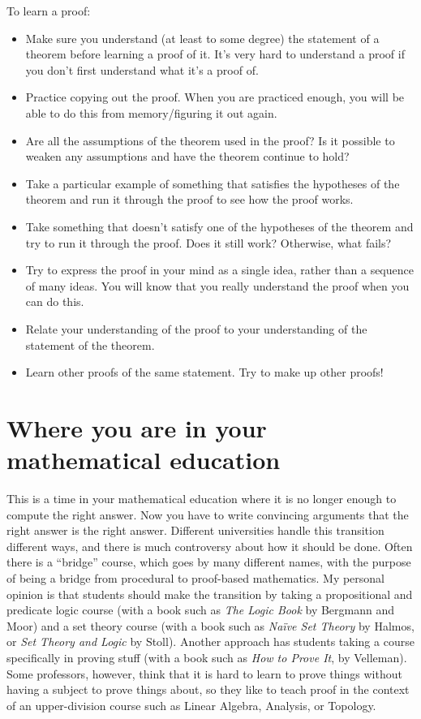 \documentclass[12pt]{article}
\begin{document}
To learn a proof:
\begin{itemize}
  \item Make sure you understand (at least to some degree) the
    statement of a theorem before learning a proof of it.  It's very
    hard to understand a proof if you don't first understand what it's
    a proof of. 
  \item Practice copying out the proof.  When you are practiced
    enough, you will be able to do this from memory/figuring it out
    again. 
  \item Are all the assumptions of the theorem used in the proof?  Is
    it possible to weaken any assumptions and have the theorem
    continue to hold? 
  \item Take a particular example of something that satisfies the
    hypotheses of the theorem and run it through the proof to see how
    the proof works. 
  \item Take something that doesn't satisfy one of the hypotheses of
    the theorem and try to run it through the proof.  Does it still
    work? Otherwise, what fails? 
  \item Try to express the proof in your mind as a single idea, rather
    than a sequence of many ideas.  You will know that you really
    understand the proof when you can do this.
  \item Relate your understanding of the proof to your understanding
    of the statement of the theorem. 
  \item Learn other proofs of the same statement.  Try to make up other proofs!
\end{itemize}

\section{Where you are in your mathematical education}

This is a time in your mathematical education where it is no longer
enough to compute the right answer.  Now you have to write convincing
arguments that the right answer is the right answer.  Different
universities handle this transition different ways, and there is much
controversy about how it should be done.  Often there is a ``bridge''
course, which goes by many different names, with the purpose of being
a bridge from procedural to proof-based mathematics.  My personal
opinion is that students should make the transition by taking a
propositional and predicate logic course (with a book such as
\textit{The Logic Book} by Bergmann and Moor) and a set theory course
(with a book such as \textit{Na\"{i}ve Set Theory} by Halmos, or
\textit{Set Theory and Logic} by Stoll).  Another approach has
students taking a course specifically in proving stuff (with a book
such as \textit{How to Prove It}, by Velleman).  Some professors,
however, think that it is hard to learn to prove things without having
a subject to prove things about, so they like to teach proof in the
context of an upper-division course such as Linear Algebra, Analysis,
or Topology.
\end{document}
